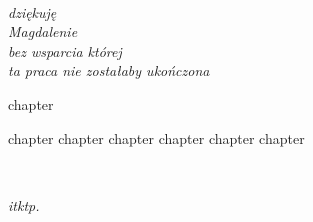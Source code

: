 \documentclass[
  a4paper,
  twoside,
  justified,
  nobib,
  nofonts,
  marginals=raggedright,
]{tufte-book}
\begin{document}
\frontmatter
\maketitle

\cleardoublepage
\thispagestyle{empty}
~\vfill
\vfill
\begin{fullwidth}
\raggedleft\noindent\fontsize{16}{26}\selectfont\itshape
\nohyphenation
dziękuję \\
Magdalenie \\
bez wsparcia której \\
ta praca nie zostałaby ukończona
\end{fullwidth}
\vfill

\tableofcontents

{chapter}

\mainmatter

{chapter}
{chapter}
{chapter}
{chapter}
{chapter}
{chapter}

\backmatter


\cleardoublepage%
\thispagestyle{empty}%
~\vfill%
\vfill%
{%
  \begin{fullwidth}%
    \raggedleft\noindent\fontsize{16}{26}\selectfont\itshape%
    itktp.\hspace*{0.2\textwidth}\par%
  \end{fullwidth}%
}%
\vfill%
\end{document}
